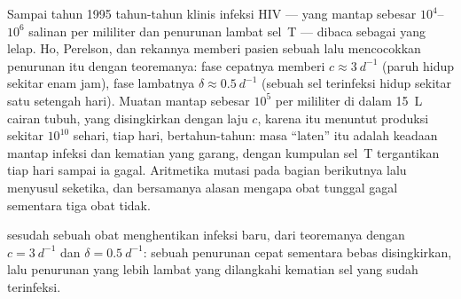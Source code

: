 \begin{example}\label{ex:b3:virology:hiv}
Sampai tahun 1995 tahun-tahun  klinis infeksi HIV ---  yang
mantap sebesar $10^{4}$--$10^{6}$ salinan per mililiter dan penurunan lambat
sel~T --- dibaca sebagai  yang lelap. Ho, Perelson, dan rekannya memberi
pasien sebuah  lalu mencocokkan penurunan  itu
dengan teoremanya: fase cepatnya memberi $c \approx \qty{3}{d^{-1}}$
(paruh hidup  sekitar enam jam), fase lambatnya $\delta \approx
\qty{0.5}{d^{-1}}$ (sebuah sel terinfeksi hidup sekitar satu setengah hari).
Muatan mantap sebesar $10^{5}$ per mililiter di dalam \qty{15}{L} cairan tubuh,
yang disingkirkan dengan laju $c$, karena itu menuntut produksi sekitar
$10^{10}$  sehari, tiap hari, bertahun-tahun: masa ``laten'' itu adalah
keadaan mantap infeksi dan kematian yang garang, dengan kumpulan sel~T
tergantikan tiap hari sampai ia gagal. Aritmetika mutasi pada bagian berikutnya
lalu menyusul seketika, dan bersamanya alasan mengapa obat tunggal gagal
sementara tiga obat tidak.
\end{example}

\begin{omfigure}

{\small {} sesudah sebuah obat menghentikan infeksi baru, dari
teoremanya dengan $c = \qty{3}{d^{-1}}$ dan $\delta = \qty{0.5}{d^{-1}}$:
sebuah penurunan cepat sementara  bebas disingkirkan, lalu penurunan yang
lebih lambat yang dilangkahi kematian sel yang sudah terinfeksi.}
\end{omfigure}

